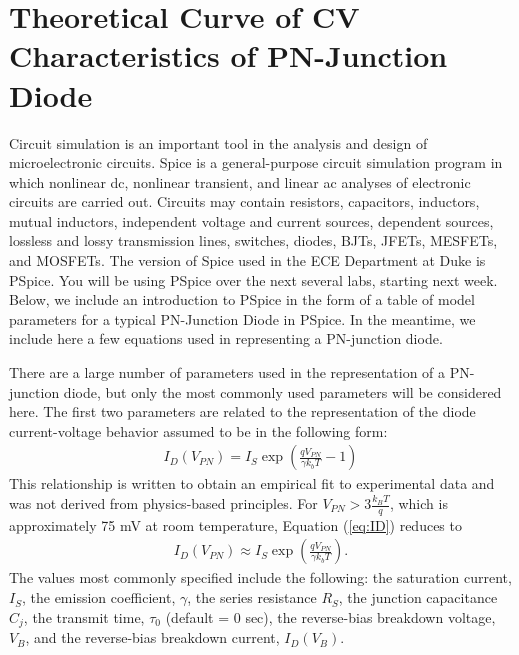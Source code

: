 \documentclass[12pt]{../manual}
\begin{document}
\section{Theoretical Curve of CV Characteristics of PN-Junction Diode}
Circuit simulation is an important tool in the analysis and design of microelectronic circuits. Spice is a general-purpose circuit simulation program in which nonlinear dc, nonlinear transient, and linear ac analyses of electronic circuits are carried out. Circuits may contain resistors, capacitors, inductors, mutual inductors, independent voltage and current sources, dependent sources, lossless and lossy transmission lines, switches, diodes, BJTs, JFETs, MESFETs, and MOSFETs. The version of Spice used in the ECE Department at Duke is PSpice. You will be using PSpice over the next several labs, starting next week. Below, we include an introduction to PSpice in the form of a table of model parameters for a typical PN-Junction Diode in PSpice. In the meantime, we include here a few equations used in representing a PN-junction diode.

There are a large number of parameters used in the representation of a PN-junction
diode, but only the most commonly used parameters will be considered here. The first
two parameters are related to the representation of the diode current-voltage behavior
assumed to be in the following form:
\begin{align}
I_D(V_{PN}) = I_S \exp\left(\frac{q V_{PN}}{\gamma k_b T} - 1\right) \label{eq:ID}
\end{align}
This relationship is written to obtain an empirical fit to experimental data and was not derived from physics-based principles. For $V_{PN} > 3\frac{k_BT}{q}$, which is
approximately 75 mV at room temperature, Equation (\ref{eq:ID}) reduces to
\begin{align}
I_D(V_{PN}) \approx I_S \exp\left(\frac{q V_{PN}}{\gamma k_b T}\right). \label{eq:redID}
\end{align}
The values most commonly specified include the following: the saturation current, $I_S$, the emission coefficient, $\gamma$, the series resistance $R_S$, the junction capacitance $C_j$, the transmit time, $\tau_0$ (default = 0 sec), the reverse-bias breakdown voltage, $V_B$, and the reverse-bias breakdown current, $I_D(V_B)$.
\end{document}
